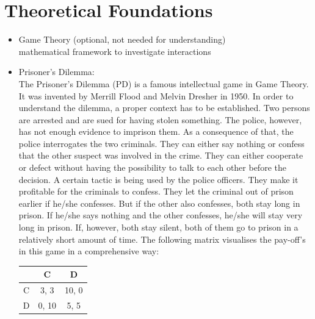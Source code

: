 \documentclass{article}
\begin{document}
\section{Theoretical Foundations}
\begin{itemize}

	\item Game Theory (optional, not needed for understanding)\\
		mathematical framework to investigate interactions\\

	\item Prisoner's Dilemma:\\
		
The Prisoner's Dilemma (PD) is a famous intellectual game in Game Theory. 
It was invented by Merrill Flood and Melvin Dresher in 1950. 
In order to understand the dilemma, a proper context has to be established. 
Two persons are arrested and are sued for having stolen something. 
The police, however, has not enough evidence to imprison them. 
As a consequence of that, the police interrogates the two criminals. 
They can either say nothing or confess that the other suspect was involved in the crime. 
They can either cooperate or defect without having the possibility to talk to each other before the decision. 
A certain tactic is being used by the police officers. 
They make it profitable for the criminals to confess. 
They let the criminal out of prison earlier if he/she confesses. 
But if the other also confesses, both stay long in prison. 
If he/she says nothing and the other confesses, he/she will stay very long in prison. 
If, however, both stay silent, both of them go to prison in a relatively short amount of time. 
The following matrix visualises the pay-off's in this game in a comprehensive way:

\begin{center}
\begin{tabular}{ c|c|c }
   & C & D \\ 
   \hline
 C & 3, 3 & 10, 0\\  
   \hline
 D & 0, 10 & 5, 5
\end{tabular}
\end{center}


\end{itemize}
\end{document}
